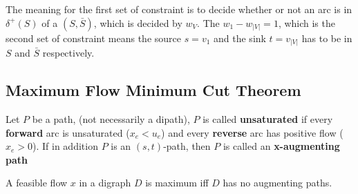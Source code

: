                 The meaning for the first set of constraint is to decide whether or not an arc is in $\delta^+(S)$ of a $(S, \bar{S})$, which is decided by $w_V$. The $w_1 - w_{|V|} = 1$, which is the second set of constraint means the source $s = v_1$ and the sink $t = v_{|V|}$ has to be in $S$ and $\bar{S}$ respectively.

            \subsection{Maximum Flow Minimum Cut Theorem}
                \begin{definition}
                    Let $P$ be a path, (not necessarily a dipath), $P$ is called \textbf{unsaturated} if every \textbf{forward} arc is unsaturated ($x_e < u_e$) and every \textbf{reverse} arc has positive flow ($x_e > 0$). If in addition $P$ is an $(s, t)$-path, then $P$ is called an \textbf{x-augmenting path}
                \end{definition}

                \begin{theorem}
                    A feasible flow $x$ in a digraph $D$ is maximum iff $D$ has no augmenting paths.
                \end{theorem}


